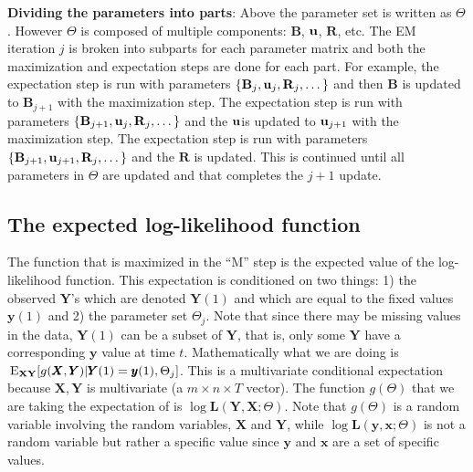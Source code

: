 \documentclass[]{article}
\def\BB{\mbox{$\mathbf B$}}	\def\bb{\mbox{$\mathbf b$}}
\def\RR{\mbox{$\mathbf R$}}	 \def\rr{\mbox{$\mathbf r$}}
\def\XX{\mbox{$\pmb{X}$}}	\def\xx{\mbox{$\pmb{x}$}}
\def\YY{\mbox{$\pmb{Y}$}}	\def\yy{\mbox{$\pmb{y}$}}
\def\LL{\mbox{$\pmb{L}$}}	\def\ll{\mbox{$\pmb{l}$}}
\def\EXy{\,\textup{\textrm{E}}_{\text{{\bf XY}}}}
\begin{document}
\textbf{Dividing the parameters into parts}: Above the parameter set is written as $\Theta$. However $\Theta$ is composed of multiple components: $\BB$, $\mbox{$\mathbf u$}$, $\RR$, etc. The EM iteration $j$ is broken into subparts for each parameter matrix and both the maximization and expectation steps are done for each part. For example, the expectation step is run with parameters $\{\BB_j, \uu_j, \RR_j, \dots\}$ and then $\BB$ is updated to $\BB_{j+1}$ with the maximization step. The expectation step is run with parameters $\{\BB_{j+1}, \uu_j, \RR_j, \dots \}$ and the $\mbox{$\mathbf u$}$is updated to $\mbox{$\mathbf u$}_{j+1}$ with the maximization step. The expectation step is run with parameters $\{\BB_{j+1}, \uu_{j+1}, \RR_j, \dots \}$ and the $\RR$ is updated. This is continued until all parameters in $\Theta$ are updated and that completes the $j+1$ update.

\subsection{The expected log-likelihood function}\label{sec:expLL}
The function that is maximized in the ``M'' step is the expected value of the log-likelihood function. This expectation is conditioned on two things: 1) the observed $\YY$'s which are denoted $\YY(1)$ and which are equal to the fixed values $\yy(1)$ and 2) the parameter set $\Theta_j$.  Note that since there may be missing values in the data, $\YY(1)$ can be a subset of $\YY$, that is, only some $\YY$ have a corresponding $\yy$ value at time $t$.  Mathematically what we are doing is $\EXy[g(\XX,\YY)|\YY(1)=\yy(1),\Theta_j]$.  This is a multivariate conditional expectation because $\XX,\YY$ is multivariate (a $m \times n \times T$ vector). The function $g(\Theta)$ that we are taking the expectation of is $\log\LL(\YY,\XX ; \Theta)$. Note that $g(\Theta)$ is a random variable involving the random variables, $\XX$ and $\YY$, while $\log\LL(\yy,\xx ; \Theta)$ is not a random variable but rather a specific value since $\yy$ and $\xx$ are a set of specific values.
\end{document}
